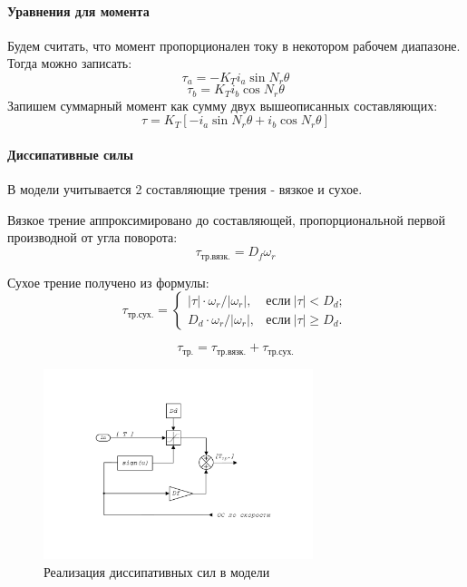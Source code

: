 \paragraph{ Уравнения для момента }
Будем считать, что момент пропорционален току в некотором рабочем диапазоне. Тогда можно записать:
$$
    \tau_{a} = - K_{T} i_{a} \sin{N_{r} \theta}
$$
$$
    \tau_{b} = K_{T} i_{b} \cos{N_{r} \theta}
$$
Запишем суммарный момент как сумму двух вышеописанных составляющих:
\begin{equation}
    \tau = K_{T} [-i_{a} \sin{N_{r}\theta} + i_{b} \cos{N_{r}\theta}]
\end{equation}


\paragraph{ Диссипативные силы }
В модели учитывается 2 составляющие трения - вязкое и сухое.

Вязкое трение аппроксимировано до составляющей, пропорциональной первой производной от угла поворота:
\begin{equation}
    \tau_{\text{тр.вязк.}} = D_{f} \omega_{r}
\end{equation}

Сухое трение получено из формулы:
\begin{equation}
    \tau_{\text{тр.сух.}} = \begin{cases}
         |\tau| \cdot {\omega_{r}}/{|\omega_{r}|}, & \text{если} ~|\tau|  <  D_{d}; \\[2mm]
         D_{d}  \cdot {\omega_{r}}/{|\omega_{r}|}, & \text{если} ~|\tau| \ge D_{d}.
    \end{cases}
\end{equation}

\begin{equation}
    \tau_{\text{тр.}} = \tau_{\text{тр.вязк.}} + \tau_{\text{тр.сух.}}
\end{equation}

\begin{figure}[ht!]
    \centering
    \includegraphics[width=0.7\textwidth, keepaspectratio, clip=true, trim=25mm 35mm 25mm 35mm]
                    {./src/pictures/drive_model/drive_model_friction}
    \caption{Реализация диссипативных сил в модели}
    \label{pic_drive_model_friction}
\end{figure}

